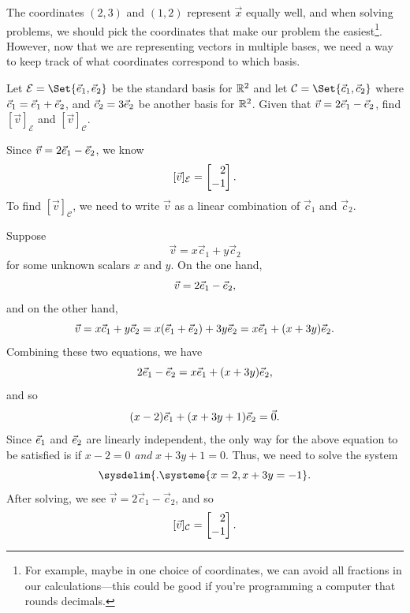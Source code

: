 The coordinates $(2,3)$ and $(1,2)$ represent $\vec x$ equally well, and when solving problems, we should pick the
coordinates that make our problem the easiest\footnote{ For example, maybe in one choice of coordinates, we can avoid all 
fractions in our calculations---this could be good if you're programming a computer that rounds decimals.}. However, now that we
are representing vectors in multiple bases, we need a way to keep track of what coordinates correspond to which basis.


\begin{example}
	Let $\mathcal E=\Set{\xhat,\yhat}$ be the standard basis for $\mathbb{R}^2$ and let $\mathcal C=\Set{\vec c_1,\vec c_2}$
	where $\vec c_1={\vec e_1}+{\vec e_2}$, and $\vec c_2 =3{\vec e_2}$ be another basis for $\mathbb{R}^2$. Given that $\vec v=2{\vec e_1}-{\vec e_2}$, 
	find $[\vec v]_{\mathcal E}$ and $[\vec v]_{\mathcal C}$.

	Since $\vec v=2{\vec e_1}-{\vec e_2}$, we know
	\[
	    [\vec v]_{\mathcal E}=\mat{2\\-1}.
	\]
	To find $[\vec v]_{\mathcal C}$, we need to write $\vec v$ as a linear combination of $\vec c_1$ and $\vec c_2$. 
	
	Suppose
	\[
		\vec v = x\vec c_1 + y\vec c_2    
	\]
	for some unknown scalars $x$ and $y$. On the one hand,
	\[
	    \vec v = 2{\vec e_1}-{\vec e_2},
	\]
	and on the other hand, 
	\[
	    \vec v  = x\vec c_1 + y\vec c_2= x({\vec e_1}+{\vec e_2})+3y{\vec e_2}=x{\vec e_1}+(x+3y){\vec e_2}.
	\]
	Combining these two equations, we have
	\[
	    2{\vec e_1}-{\vec e_2} = x{\vec e_1}+(x+3y){\vec e_2},
	\]
	and so
	\[
		(x-2){\vec e_1}+(x+3y+1){\vec e_2} = \vec 0. 
	\]
	Since ${\vec e_1}$ and ${\vec e_2}$ are linearly independent, the only way for the above equation to be satisfied is if
	$x-2=0$ \emph{and} $x+3y+1=0$. Thus, we need to solve the system
	\[
	    \sysdelim\{.
		\systeme{
			x=2,
			x+3y=-1
		}.
	\]
	After solving, we see $\vec v=2\vec c_1 - \vec c_2$, and so
	\[
	   [\vec v]_{\mathcal C}=\mat{2\\-1}. 
	\]
\end{example}

